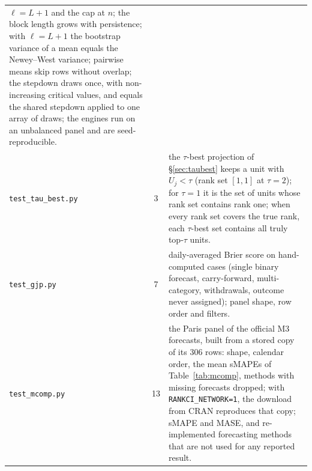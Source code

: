 \begin{table}[htb]
\begin{tabular}{lcp{9.6cm}}
        $\ell=L+1$ and the cap at $n$; the block length grows with persistence; with
        $\ell=L+1$ the bootstrap variance of a mean equals the Newey--West variance;
        pairwise means skip rows without overlap; the stepdown draws once, with
        non-increasing critical values, and equals the shared stepdown applied to one
        array of draws; the engines run on an unbalanced panel and are
        seed-reproducible.\\
    \texttt{test\_tau\_best.py} & 3
      & the $\tau$-best projection of \S\ref{sec:taubest} keeps a unit with
        $U_j<\tau$ (rank set $[1,1]$ at $\tau=2$); for $\tau=1$ it is the set of units
        whose rank set contains rank one; when every rank set covers the true rank, each
        $\tau$-best set contains all truly top-$\tau$ units.\\
    \texttt{test\_gjp.py} & 7
      & daily-averaged Brier score on hand-computed cases (single binary
        forecast, carry-forward, multi-category, withdrawals, outcome never
        assigned); panel shape, row order and filters.\\
    \texttt{test\_mcomp.py} & 13
      & the Paris panel of the official M3 forecasts, built from a stored copy of
        its 306 rows: shape, calendar order, the mean sMAPEs of
        Table~\ref{tab:mcomp}, methods with missing forecasts dropped; with
        \texttt{RANKCI\_NETWORK=1}, the download from CRAN reproduces that copy;
        sMAPE and MASE, and re-implemented forecasting methods that are not used
        for any reported result.\\
    \bottomrule
  \end{tabular}
\end{table}
